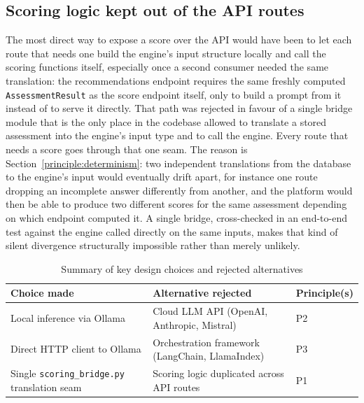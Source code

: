 \subsection{Scoring logic kept out of the API routes}

The most direct way to expose a score over the API would have been to let
each route that needs one build the engine's input structure locally and
call the scoring functions itself, especially once a second consumer
needed the same translation: the recommendations endpoint requires the
same freshly computed \texttt{Assessment\allowbreak Result} as the score
endpoint itself, only to build a prompt from it instead of to serve it
directly. That path was rejected in favour of a single
bridge module that is the only place in the codebase allowed to translate
a stored assessment into the engine's input type and to call the engine.
Every route that needs a score goes through that one seam. The reason is
Section~\ref{principle:determinism}: two independent translations from the
database to the engine's input would eventually drift apart, for instance
one route dropping an incomplete answer differently from another, and the
platform would then be able to produce two different scores for the same
assessment depending on which endpoint computed it. A single bridge,
cross-checked in an end-to-end test against the engine called directly on
the same inputs, makes that kind of silent divergence structurally
impossible rather than merely unlikely.

\begin{table}[htbp]
  \centering
  \begin{tabular}{@{}p{}p{}p{}@{}}
    \toprule
    Choice made & Alternative rejected & Principle(s) \\
    \midrule
    Local inference via Ollama & Cloud LLM API (OpenAI, Anthropic, Mistral) & P2 \\
    Direct HTTP client to Ollama & Orchestration framework (LangChain, LlamaIndex) & P3 \\
    Single \texttt{scoring\_\allowbreak bridge.\allowbreak py} translation seam & Scoring logic duplicated across API routes & P1 \\
    \bottomrule
  \end{tabular}
  \caption{Summary of key design choices and rejected alternatives}
  \label{tab:rejected-alternatives}
\end{table}